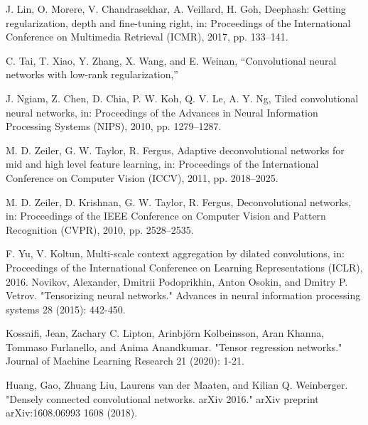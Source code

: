 \documentclass{report}
\begin{document}
\begin{thebibliography}{1}
J. Lin, O. Morere, V. Chandrasekhar, A. Veillard, H. Goh, Deephash: Getting regularization, depth and fine-tuning
right, in: Proceedings of the International Conference on Multimedia Retrieval (ICMR), 2017, pp. 133–141.

C. Tai, T. Xiao, Y. Zhang, X. Wang, and E. Weinan, “Convolutional neural networks with low-rank regularization,”

J. Ngiam, Z. Chen, D. Chia, P. W. Koh, Q. V. Le, A. Y. Ng, Tiled convolutional neural networks, in: Proceedings of the
Advances in Neural Information Processing Systems (NIPS), 2010, pp. 1279–1287.

M. D. Zeiler, G. W. Taylor, R. Fergus, Adaptive deconvolutional networks for mid and high level feature learning, in:
Proceedings of the International Conference on Computer Vision (ICCV), 2011, pp. 2018–2025.

M. D. Zeiler, D. Krishnan, G. W. Taylor, R. Fergus, Deconvolutional networks, in: Proceedings of the IEEE Conference
on Computer Vision and Pattern Recognition (CVPR), 2010, pp. 2528–2535.

 F. Yu, V. Koltun, Multi-scale context aggregation by dilated convolutions, in: Proceedings of the International Conference
on Learning Representations (ICLR), 2016.
Novikov, Alexander, Dmitrii Podoprikhin, Anton Osokin, and Dmitry P. Vetrov. "Tensorizing neural networks." Advances in neural information processing systems 28 (2015): 442-450.

Kossaifi, Jean, Zachary C. Lipton, Arinbjörn Kolbeinsson, Aran Khanna, Tommaso Furlanello, and Anima Anandkumar. "Tensor regression networks." Journal of Machine Learning Research 21 (2020): 1-21.

Huang, Gao, Zhuang Liu, Laurens van der Maaten, and Kilian Q. Weinberger. "Densely connected convolutional networks. arXiv 2016." arXiv preprint arXiv:1608.06993 1608 (2018).

\end{thebibliography}
\end{document}

